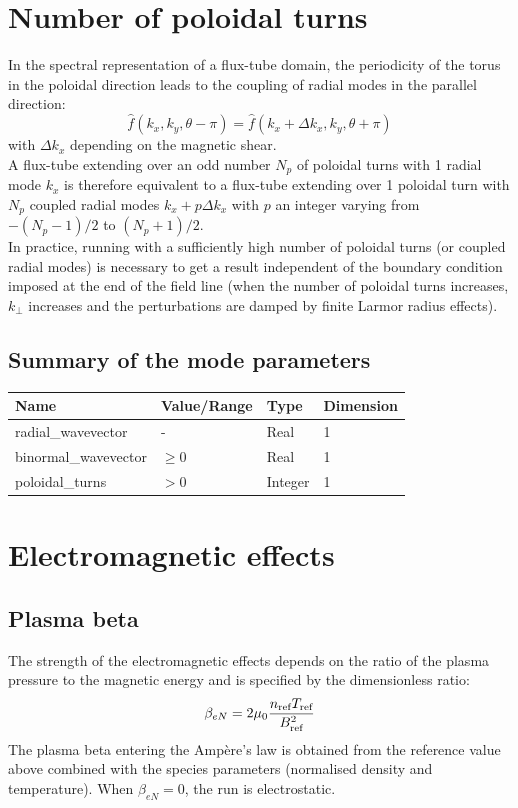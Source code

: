 \documentclass[fleqn]{report}
\begin{document}
\section{Number of poloidal turns}
In the spectral representation of a flux-tube domain, the periodicity of the torus in the poloidal direction leads to the coupling of radial modes in the parallel direction:
$$\hat{f}(k_x,k_y,\theta-\pi)=\hat{f}(k_x+\Delta k_x,k_y,\theta+\pi)$$
with $\Delta k_x$ depending on the magnetic shear.\\
A flux-tube extending over an odd number $N_p$ of poloidal turns with 1 radial mode $k_x$ is therefore equivalent to a flux-tube extending over 1 poloidal turn with $N_p$ coupled radial modes $k_x + p\Delta k_x$ with $p$ an integer varying from $-(N_p-1)/2$ to $(N_p+1)/2$.\\ 
In practice, running with a sufficiently high number of poloidal turns (or coupled radial modes) is necessary to get a result independent of the boundary condition imposed at the end of the field line (when the number of poloidal turns increases, $k_\perp$ increases and the perturbations are damped by finite Larmor radius effects). 

\subsection{Summary of the mode parameters}
\begin{tabularx}{\textwidth}{|X|Y|Y|Y|}
\hline
Name & Value/Range & Type & Dimension \\
\hline
radial\_wavevector & - & Real & 1 \\
binormal\_wavevector & $\geq 0$ & Real & 1 \\
poloidal\_turns & $>0$ & Integer & 1 \\
\hline
\end{tabularx}

\section{Electromagnetic effects}
\subsection{Plasma beta}
The strength of the electromagnetic effects depends on the ratio of the plasma pressure to the magnetic energy and is specified by the dimensionless ratio:
\begin{equation}
\beta_{eN} = 2\mu_0 \frac{n_{\textrm{ref}} T_{\textrm{ref}}}{B_{\textrm{ref}}^2}
\end{equation}
The plasma beta entering the Amp\`ere's law is obtained from the reference value above combined with the species parameters (normalised density and temperature).
When $\beta_{eN}=0$, the run is electrostatic. 
\end{document}
